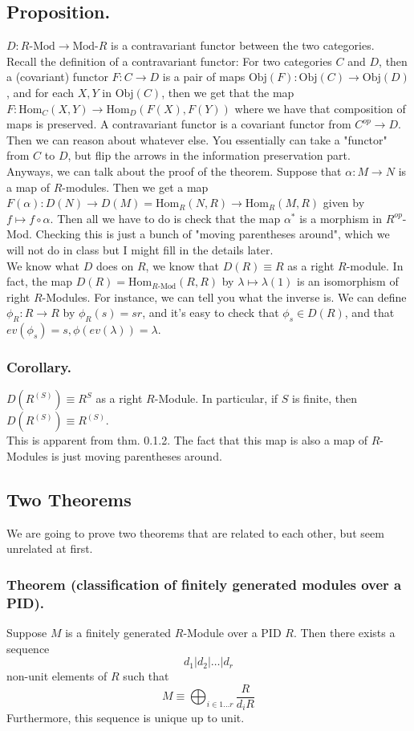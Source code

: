 \documentclass{article}
\newcommand{\vs}{\bigskip\\\text{}}
\begin{document}
\subsection{Proposition.} $D: \text{$R$-Mod} \to \text{Mod-$R$}$ is a
contravariant functor between the two categories.\vs
Recall the definition of a contravariant functor: For two categories $C$ and
$D$, then a (covariant) functor $F: C\to D$ is a pair of maps $\text{Obj}(F):
\text{Obj}(C)\to \text{Obj}(D)$, and for each $X,Y$ in $\text{Obj}(C)$, then
we get that the map $F: \text{Hom}_C(X,Y) \to \text{Hom}_D(F(X), F(Y))$
where we have that composition of maps is preserved. A contravariant functor is
a covariant functor from $C^{op}\to D$. Then we can reason about whatever else.
You essentially can take a "functor" from $C$ to $D$, but flip the arrows in the
information preservation part.\vs
Anyways, we can talk about the proof of the theorem. Suppose that $\alpha: M \to
N$ is a map of $R$-modules. Then we get a map $F(\alpha): D(N) \to D(M) =
\text{Hom}_R(N,R) \to \text{Hom}_R(M,R)$ given by $f \mapsto f\circ \alpha$.
Then all we have to do is check that the map $\alpha^*$ is a morphism in
$R^{op}$-Mod. Checking this is just a bunch of "moving parentheses around",
which we will not do in class but I might fill in the details later.\vs
%
We know what $D$ does on $R$, we know that $D(R) \equiv R$ as a right
$R$-module. In fact, the map $D(R) = \text{Hom}_{\text{$R$-Mod}}(R,R)$ by
$\lambda \mapsto \lambda(1)$ is an isomorphism of right $R$-Modules. For
instance, we can tell you what the inverse is. We can define $\phi_R: R\to R$ by
$\phi_R(s) = sr$, and it's easy to check that $\phi_s \in D(R)$, and that
$ev(\phi_s) = s, \phi(ev(\lambda)) = \lambda$.
\subsubsection{Corollary.} $D(R^{(S)}) \equiv R^S$ as a right $R$-Module. In
particular, if $S$ is finite, then $D(R^{(S)}) \equiv R^{(S)}$.\vs
This is apparent from thm. 0.1.2. The fact that this map is also a map of
$R$-Modules is just moving parentheses around.
\subsection{Two Theorems}
We are going to prove two theorems that are related to each other, but seem
unrelated at first.
\subsubsection{Theorem (classification of finitely generated modules over a
PID).} Suppose $M$ is a finitely generated $R$-Module over a PID $R$. Then there
exists a sequence 
\[ d_1 | d_2 | \hdots | d_r\]
non-unit elements of $R$ such that
\[ M \equiv \bigoplus_{i \in 1\hdots r} \frac{R}{d_iR}\]
Furthermore, this sequence is unique up to unit.
\end{document}
